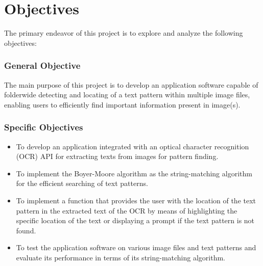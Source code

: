 \part{Objectives}

The primary endeavor of this project is to explore and analyze the following objectives:

\section*{General Objective}
\hspace\parindent
The main purpose of this project is to develop an application software capable of folderwide detecting and locating of a text pattern within multiple image files, enabling users to efficiently find important information present in image(s).

\section*{Specific Objectives}
\begin{itemize}
    \item To develop an application integrated with an optical character recognition (OCR) API for extracting texts from images for pattern finding.
    \item To implement the Boyer-Moore algorithm as the string-matching algorithm for the efficient searching of text patterns. 
    \item To implement a function that provides the user with the location of the text pattern in the extracted text of the OCR by means of highlighting the specific location of the text or displaying a prompt if the text pattern is not found.
    \item To test the application software on various image files and text patterns and evaluate its performance in terms of its string-matching algorithm. 
\end{itemize}
